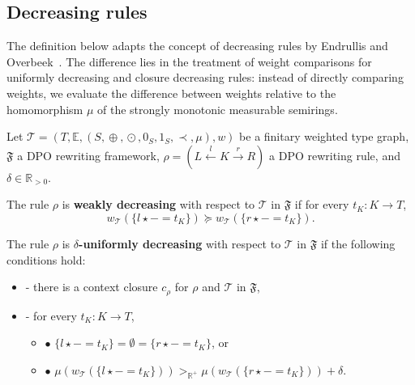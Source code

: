 
        
\subsection{Decreasing rules}
\label{nwf:sec:decreasing_rules}
The definition below adapts the concept of decreasing rules by Endrullis and Overbeek~\cite{endrullis2024generalized_arxiv_v2}. The difference lies in the treatment of weight comparisons for uniformly decreasing and closure decreasing rules: instead of directly comparing weights, we evaluate the difference between weights relative to the homomorphism $\mu$ of the strongly monotonic measurable semirings.

\begin{definition} 
    \label{nwf:def:decreasing_rule}
    Let $\mathcal{T} \mathop{=} (T,\mathbb{E}, (S, \mathop{\oplus}, \mathop{\odot}, 0_S, 1_S, \prec, \mu), w)$ be a finitary weighted type graph, \(\mathfrak{F}\) a DPO rewriting framework, $\rho \mathop{=} (L \overset{l}{\leftarrow} K \overset{r}{\rightarrow} R)$ a DPO rewriting rule, and $\delta \mathop{\in} \mathbb{R}_{>0}$. 

    \noindent
    The rule $\rho$ is \textbf{weakly decreasing} with respect to $\mathcal{T}$ in $\mathfrak{F}$ if 
            for every $t_K : K \mathop{\to} T$,
                $$ 
                  w_\mathcal{T}(\{l \mathop{\star} - \mathop{=} t_K\}) \mathop{\succeq} w_\mathcal{T}(\{r\star - \mathop{=} t_K\}).$$
           
    \noindent
    The rule $\rho$ is \textbf{$\delta$-uniformly decreasing} with respect to $\mathcal{T}$ in $\mathfrak{F}$ if the following conditions hold:
        \begin{itemize}
            \item[]- there is a context closure $c_\rho$ for $\rho$ and $\mathcal{T}$ in $\mathfrak{F}$, 
            \item[]- for every $t_K : K \mathop{\to} T$,
            \begin{itemize}
                \item[] $\bullet$ $\{l \mathop{\star} - \mathop{=} t_K\} \mathop{=} \emptyset \mathop{=} \{r \mathop{\star} - \mathop{=} t_K\}$, or
                \item[] $\bullet$ $\mu(w_\mathcal{T}(\{l \mathop{\star} - \mathop{=} t_K\}))  >_{\mathbb{R}^+}   \mu(w_\mathcal{T}(\{r \mathop{\star} - \mathop{=} t_K\}))\mathop{+}\delta$.
            \end{itemize}
        \end{itemize}  
         

\end{definition}

